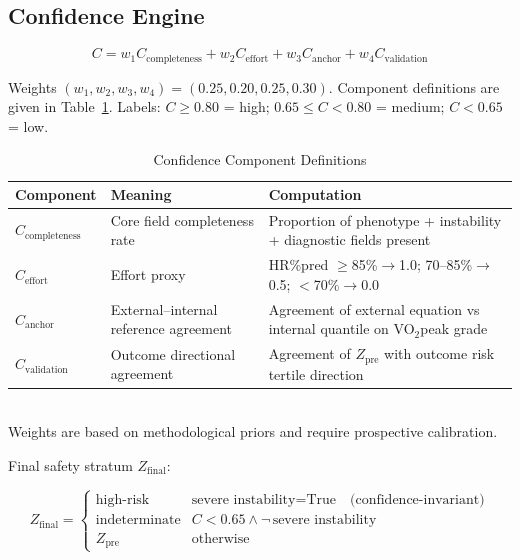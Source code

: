 \documentclass[12pt, a4paper]{article}
\begin{document}
\subsection{Confidence Engine}

\begin{equation}
\label{eq:confidence_en}
C = w_1 C_{\text{completeness}} + w_2 C_{\text{effort}}
    + w_3 C_{\text{anchor}} + w_4 C_{\text{validation}}
\end{equation}

Weights $(w_1, w_2, w_3, w_4) = (0.25, 0.20, 0.25, 0.30)$. Component
definitions are given in Table~\ref{tab:confidence_components_en}. Labels:
$C \geq 0.80$ = high; $0.65 \leq C < 0.80$ = medium; $C < 0.65$ = low.

\begin{table}[htbp]
\centering
\small
\caption{Confidence Component Definitions}
\label{tab:confidence_components_en}
\begin{tabular}{lll}
\toprule
Component & Meaning & Computation \\
\midrule
$C_{\text{completeness}}$ & Core field completeness rate & Proportion of phenotype + instability + diagnostic fields present \\
$C_{\text{effort}}$ & Effort proxy & HR\%pred $\geq$85\%$\to$1.0; 70--85\%$\to$0.5; $<$70\%$\to$0.0 \\
$C_{\text{anchor}}$ & External--internal reference agreement & Agreement of external equation vs internal quantile on VO$_2$peak grade \\
$C_{\text{validation}}$ & Outcome directional agreement & Agreement of $Z_{\text{pre}}$ with outcome risk tertile direction \\
\bottomrule
\end{tabular}
\\[1ex]
{\footnotesize Weights are based on methodological priors and require prospective calibration.}
\end{table}

Final safety stratum $Z_{\text{final}}$:

\begin{equation}
\label{eq:final_zone_en}
Z_{\text{final}} =
\begin{cases}
\text{high-risk}      & \text{severe instability} = \text{True}
                        \quad \text{(confidence-invariant)} \\
\text{indeterminate}  & C < 0.65 \wedge \neg\,\text{severe instability} \\
Z_{\text{pre}}        & \text{otherwise}
\end{cases}
\end{equation}
\end{document}
